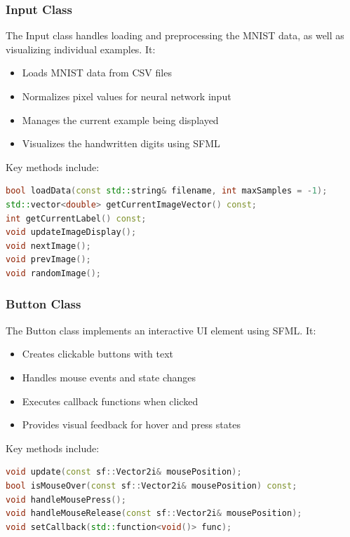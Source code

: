 \documentclass[12pt]{article}
\begin{document}
\subsubsection{Input Class}

The Input class handles loading and preprocessing the MNIST data, as well as visualizing individual examples. It:

\begin{itemize}
    \item Loads MNIST data from CSV files
    \item Normalizes pixel values for neural network input
    \item Manages the current example being displayed
    \item Visualizes the handwritten digits using SFML
\end{itemize}

Key methods include:
\begin{lstlisting}[language=C++]
bool loadData(const std::string& filename, int maxSamples = -1);
std::vector<double> getCurrentImageVector() const;
int getCurrentLabel() const;
void updateImageDisplay();
void nextImage();
void prevImage();
void randomImage();
\end{lstlisting}

\subsubsection{Button Class}

The Button class implements an interactive UI element using SFML. It:

\begin{itemize}
    \item Creates clickable buttons with text
    \item Handles mouse events and state changes
    \item Executes callback functions when clicked
    \item Provides visual feedback for hover and press states
\end{itemize}

Key methods include:
\begin{lstlisting}[language=C++]
void update(const sf::Vector2i& mousePosition);
bool isMouseOver(const sf::Vector2i& mousePosition) const;
void handleMousePress();
void handleMouseRelease(const sf::Vector2i& mousePosition);
void setCallback(std::function<void()> func);
\end{lstlisting}
\end{document}
